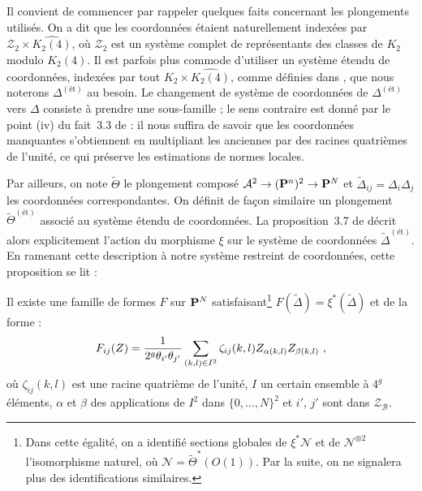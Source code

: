 
Il convient de commencer par rappeler quelques faits concernant les
plongements utilisés. On a dit que les coordonnées étaient naturellement
indexées par $\mathcal{Z}_2 \times \widehat{K_2(4)}$, où $\mathcal{Z}_2$ est
un système complet de représentants des classes de $K_2$ modulo $K_2(4)$. Il
est parfois plus commode d'utiliser un système étendu de coordonnées, indexées
par tout $K_2 \times \widehat{K_2(4)}$, comme définies dans
\cite[p.~651]{daphimhva2}, que nous noterons $\Delta^{(\text{ét})}$ au
besoin. Le changement de système de coordonnées de $\Delta^{(\text{ét})}$ vers
$\Delta$ consiste à prendre une sous-famille ; le sens contraire est donné par
le point (iv) du fait~3.3 de  : il nous suffira de savoir que
les coordonnées manquantes s'obtiennent en multipliant les anciennes par des
racines quatrièmes de l'unité, ce qui préserve les estimations de normes
locales.

Par ailleurs, on note $\tilde\Theta$ le plongement composé $\mathcal A^2 \to
({\mathbf{P}}^n)^2 \to {\mathbf{P}}^N$ et $\tilde\Delta_{ij} = \Delta_i\Delta_j$ les
coordonnées correspondantes. On définit de façon similaire un plongement
$\tilde\Theta^{(\text{ét})}$ associé au système étendu de coordonnées. La
proposition~3.7 de \cite{daphimhva2} décrit alors explicitement l'action du
morphisme $\xi$ sur le système de coordonnées $\tilde\Delta^{(\text{ét})}$. En
ramenant cette description à notre système restreint de coordonnées, cette
proposition se lit :

\begin{fact}
  Il existe une famille de formes $F$ sur ${\mathbf{P}}^N$ satisfaisant\footnote{Dans
    cette égalité, on a identifié sections globales de $\xi^*\mathcal N$ et de
    $\mathcal N ^{\otimes 2}$  l'isomorphisme naturel, où $\mathcal N
    = \tilde\Theta^*(O(1))$. Par la suite, on ne signalera plus des
    identifications similaires.} $F(\tilde\Delta) = \xi^*(\tilde\Delta)$ et de
  la forme :
  \begin{equation}
    F_{ij}(Z) = \frac 1{2^g \theta_{i'}\theta_{j'}}\sum_{(k,l)\in I^2}
    \zeta_{ij}(k, l) Z_{\alpha(k, l)} Z_{\beta(k, l)} \text{ ,}
  \end{equation}
  où $\zeta_{ij}(k, l)$ est une racine quatrième de l'unité, $I$ un certain
  ensemble à $4^g$ éléments, $\alpha$ et $\beta$ des applications de $I^2$
  dans $\{0,\dots,N\}^2$ et $i'$, $j'$ sont dans $\mathcal Z_{\mathcal B}$.
\end{fact}

